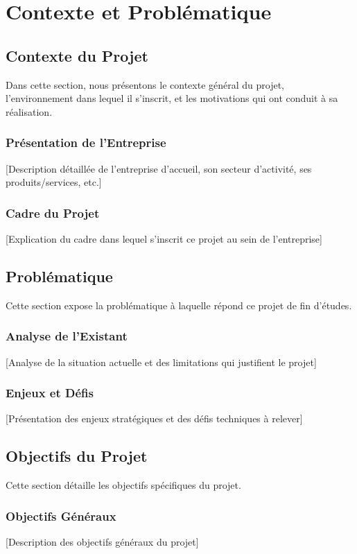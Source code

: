 
\chapter{Contexte et Problématique}

\section{Contexte du Projet}
Dans cette section, nous présentons le contexte général du projet, l'environnement dans lequel il s'inscrit, et les motivations qui ont conduit à sa réalisation.

\subsection{Présentation de l'Entreprise}
[Description détaillée de l'entreprise d'accueil, son secteur d'activité, ses produits/services, etc.]

\subsection{Cadre du Projet}
[Explication du cadre dans lequel s'inscrit ce projet au sein de l'entreprise]

\section{Problématique}
Cette section expose la problématique à laquelle répond ce projet de fin d'études.

\subsection{Analyse de l'Existant}
[Analyse de la situation actuelle et des limitations qui justifient le projet]

\subsection{Enjeux et Défis}
[Présentation des enjeux stratégiques et des défis techniques à relever]

\section{Objectifs du Projet}
Cette section détaille les objectifs spécifiques du projet.

\subsection{Objectifs Généraux}
[Description des objectifs généraux du projet]

